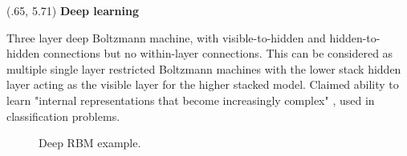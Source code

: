 \documentclass[extrafontsizes, 30pt]{memoir}
\begin{document}
\begin{textblock}{14}(.65, 5.71)
{\large \bfseries Deep learning} \\[.25cm]
\begin{minipage}{.62\textwidth}
Three layer deep Boltzmann machine, with visible-to-hidden and hidden-to-hidden connections but no within-layer connections. This can be considered as multiple single layer restricted Boltzmann machines with the lower stack hidden layer acting as the visible layer for the higher stacked model. Claimed ability to learn "internal representations that become increasingly complex" \cite{salakhutdinov2009deep}, used in classification problems.
\end{minipage}
\begin{minipage}{.38\textwidth}
\begin{figure}
  \centering
  
  \caption{Deep RBM example.}
  \label{fig:deep_rbm}
\end{figure}
\end{minipage}


\end{textblock}
\end{document}
